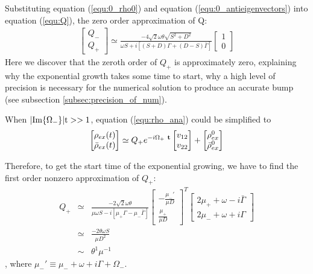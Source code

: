 \documentclass[aps,prd,twocolumn,amsmath,amssymb,groupedaddress]{revtex4-2}
\begin{document}
Substituting equation (\ref{equ:0_rho0}) and equation (\ref{equ:0_antieigenvectors}) into equation (\ref{equ:Q}), the zero order approximation of Q:
\begin{eqnarray}
	\label{equ:0_Q}
	\begin{bmatrix}
		Q_- \\ Q_+
	\end{bmatrix} \simeq \frac{-4\sqrt{2}\omega \theta \sqrt{S^2+D^2}}{\omega S + i\left[(S+D) \Gamma + (D-S) \bar{\Gamma}\right]}
	\begin{bmatrix}
	1 \\ 0
	\end{bmatrix}
\end{eqnarray}
Here we discover that the zeroth order of $Q_+$ is approximately zero, explaining why the exponential growth takes some time to start,  why a high level of precision is necessary for the numerical solution to produce an accurate bump (see subsection \ref{subsec:precision_of_num}).

When $|\rm{Im}\{\Omega_-\}| t>>1$, equation (\ref{equ:rho_ana}) could be simplified to
\begin{eqnarray}
	\begin{bmatrix}
		\rho_{ex} (t)\\ \bar{\rho}_{ex} (t)
	\end{bmatrix}
	\simeq
	Q_+e^{-i \Omega_{+} ~\bf{t}}
	\begin{bmatrix}
		v_{12}  \\ v_{22}
	\end{bmatrix} + 
	\begin{bmatrix} 
		\rho^0_{ex} \\ \bar{\rho}^0_{ex}
	\end{bmatrix}
\end{eqnarray}

Therefore, to get the start time of the exponential growing, we have to find the first order nonzero approximation of $Q_+$:
\begin{eqnarray}
	\label{equ:Qp}
	Q_+	&\simeq&
	\frac{-2\sqrt{2}\omega \theta}{\mu \omega S - i \left[\mu_+ \Gamma - \mu_- \bar{\Gamma} \right]}
	\begin{bmatrix}
		-\frac{\mu_-'}{\mu D} \\ \frac{\mu_+}{\mu D}
	\end{bmatrix}^T
	\begin{bmatrix}
		2\mu_+ + \omega - i \bar{\Gamma} \\ 2\mu_- + \omega + i \Gamma
	\end{bmatrix} \nonumber \\
	&\simeq&
	\frac{-2 \theta\omega S}{\mu D^2}\\
	&\sim&
	\theta^1 \mu^{-1}
\end{eqnarray}, where $\mu_-' \equiv \mu_- + \omega + i \Gamma + \Omega_-$.
\end{document}
